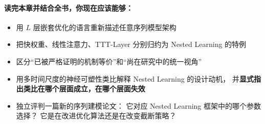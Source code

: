 \paragraph{读完本章并结合全书，你现在应该能够：}
\begin{itemize}
  \item 用 $L$ 层嵌套优化的语言重新描述任意序列模型架构
  \item 把快权重、线性注意力、TTT-Layer 分别归约为 Nested Learning 的特例
  \item 区分``已被严格证明的机制等价''和``尚在研究中的统一视角''
  \item 用多时间尺度的神经可塑性类比解释 Nested Learning 的设计动机，
        并\textbf{显式指出类比在哪个层面成立，在哪个层面失效}
  \item 独立评判一篇新的序列建模论文：
        它对应 Nested Learning 框架中的哪个参数选择？
        它是在改进优化算法还是在改变截断策略？
\end{itemize}
